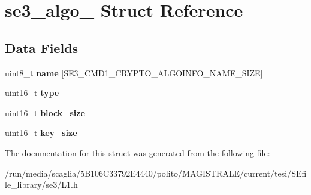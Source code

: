 \hypertarget{structse3__algo__}{\section{se3\-\_\-algo\-\_\- Struct Reference}
\label{structse3__algo__}
}
\subsection*{Data Fields}
\begin{DoxyCompactItemize}
\item 
\hypertarget{structse3__algo___a36ad4f84ca7ca240d5d1acf1ec8c4b83}{uint8\-\_\-t {\bfseries name} \mbox{[}S\-E3\-\_\-\-C\-M\-D1\-\_\-\-C\-R\-Y\-P\-T\-O\-\_\-\-A\-L\-G\-O\-I\-N\-F\-O\-\_\-\-N\-A\-M\-E\-\_\-\-S\-I\-Z\-E\mbox{]}}\label{structse3__algo___a36ad4f84ca7ca240d5d1acf1ec8c4b83}

\item 
\hypertarget{structse3__algo___ac2a8eae36ad73e8f7c3097af0ddb518d}{uint16\-\_\-t {\bfseries type}}\label{structse3__algo___ac2a8eae36ad73e8f7c3097af0ddb518d}

\item 
\hypertarget{structse3__algo___ad00721d245c6db1827b08820cbb432f1}{uint16\-\_\-t {\bfseries block\-\_\-size}}\label{structse3__algo___ad00721d245c6db1827b08820cbb432f1}

\item 
\hypertarget{structse3__algo___a0d49d27de7e5ea61554621c28807bd91}{uint16\-\_\-t {\bfseries key\-\_\-size}}\label{structse3__algo___a0d49d27de7e5ea61554621c28807bd91}

\end{DoxyCompactItemize}


The documentation for this struct was generated from the following file\-:\begin{DoxyCompactItemize}
\item 
/run/media/scaglia/5\-B106\-C33792\-E4440/polito/\-M\-A\-G\-I\-S\-T\-R\-A\-L\-E/current/tesi/\-S\-Efile\-\_\-library/se3/L1.\-h\end{DoxyCompactItemize}
